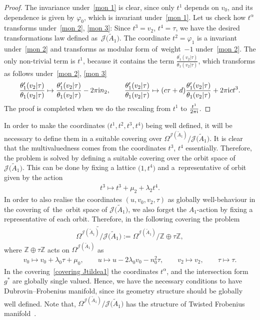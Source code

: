 \documentclass[pdftex]{sigma}%
\numberwithin{equation}{section}
\newcommand{\Ja}{\mathcal{J}}
\begin{document}
\begin{proof}
The invariance under~\eqref{mon 1} is clear, since only $t^1$ depends on $v_0$, and its dependence is given by $\varphi_0$, which is invariant under~\eqref{mon 1}. Let us check how $t^{\alpha}$ transforms under~\eqref{mon 2}, \eqref{mon 3}: Since $t^3=v_2$, $t^4=\tau$, we have the desired transformations law defined as~$\Ja\big(\tilde A_1\big)$. The coordinate $t^2=\varphi_1$ is a invariant under~\eqref{mon 2} and transforms as modular form of~weight~$-1$ under~\eqref{mon 2}. The only non-trivial term is $t^1$, because it contains the term $\frac{\theta_1^{\prime}(v_2|\tau)}{\theta_1(v_2|\tau)}$, which transforms as follows under~\eqref{mon 2}, \eqref{mon 3}~\cite{E.T.WhittakerandG.N.Watson}
\begin{gather*}
\frac{\theta_1^{\prime}(v_2|\tau)}{\theta_1(v_2|\tau)}\mapsto \frac{\theta_1^{\prime}(v_2|\tau)}{\theta_1(v_2|\tau)}-2\pi {\rm i} n_2, \qquad
\frac{\theta_1^{\prime}(v_2|\tau)}{\theta_1(v_2|\tau)}\mapsto (c\tau+d)\frac{\theta_1^{\prime}(v_2|\tau)}{\theta_1(v_2|\tau)} +2\pi {\rm i} ct^3.
\end{gather*}
The proof is completed when we do the rescaling from $t^1$ to $\frac{t^1}{2\pi {\rm i}}$.
\end{proof}

In order to make the coordinates $\big(t^1,t^2,t^3,t^4\big)$ being well defined, it will be necessary to define them in a suitable covering over $\Omega^{\Ja(\tilde A_1)}/\Ja\big(\tilde A_1\big)$. It is clear that the multivaluedness comes from the coordinates $t^3$, $t^4$ essentially. Therefore, the problem is solved by defining a suitable covering over the orbit space of $\Ja\big(\tilde A_1\big)$. This can be done by fixing a lattice $\big(1,t^4\big)$ and a~representative of orbit given by the action
\begin{gather}\label{translation action of v2}
t^3\mapsto t^3+\mu_2+\lambda_2t^4.
\end{gather}
In order to also realise the coordinates $(u,v_0,v_2,\tau)$ as globally well-behaviour in the covering of~the~orbit space of $\Ja\big(\tilde A_1\big)$, we also forget the $A_1$-action by fixing a representative of each orbit. Therefore, in the following covering the problem
\begin{gather}
\label{covering Jtildea1}
\widetilde{\Omega^{\Ja(\tilde A_1)}/\Ja\big(\tilde A_1\big)}:=\Omega^{\Ja(\tilde A_1)}/\mathbb{Z}\oplus\tau\mathbb{Z},
\end{gather}
where $\mathbb{Z}\oplus\tau\mathbb{Z}$ acts on $\Omega^{\Ja(\tilde A_1)}$ as
\begin{gather*}
v_0 \mapsto v_0+\lambda_0\tau+\mu_0,\qquad
u\mapsto u-2\lambda_0v_0-n_0^2\tau,\qquad
v_2\mapsto v_2,\qquad
\tau\mapsto \tau.
\end{gather*}
 In the covering~\eqref{covering Jtildea1} the coordinates $t^{\alpha}$, and the intersection form $g^*$ are globally single valued. Hence, we have the necessary conditions to have Dubrovin--Frobenius manifold, since its geometry structure should be globally well defined. Note that, $\Omega^{\Ja(\tilde A_1)}/\Ja\big(\tilde A_1\big)$ has the structure of Twisted Frobenius manifold~\cite{B.Dubrovin2}.
\end{document}
